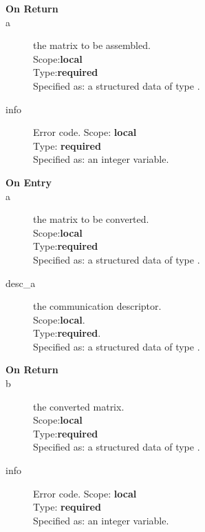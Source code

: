 \begin{description}
\item[\bf On Return]
\item[a] the matrix to be assembled.\\
Scope:{\bf local}\\
Type:{\bf required}\\
Specified as: a structured data of type \spdata.
\item[info] Error code.
Scope: {\bf local} \\
Type: {\bf required}\\
Specified as: an integer variable.
\end{description}



%
%


\begin{description}
\item[\bf On Entry]
\item[a] the matrix to be converted.\\
Scope:{\bf local}\\
Type:{\bf required}\\
Specified as: a structured data of type \spdata.
\item[desc\_a] the communication descriptor.\\
Scope:{\bf local}.\\
Type:{\bf required}.\\
Specified as: a structured data of type \descdata.
\end{description}

\begin{description}
\item[\bf On Return]
\item[b] the converted matrix.\\
Scope:{\bf local}\\
Type:{\bf required}\\
Specified as: a structured data of type \spdata.
\item[info] Error code.
Scope: {\bf local} \\
Type: {\bf required}\\
Specified as: an integer variable.
\end{description}



%
%

